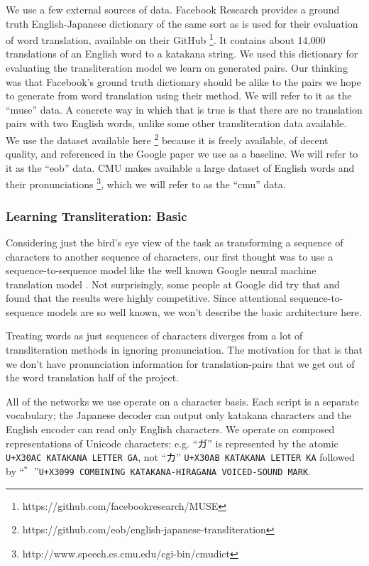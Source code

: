 \documentclass{article}
\begin{document}
We use a few external sources of data.
Facebook Research provides a ground truth English-Japanese dictionary
of the same sort as is used for their evaluation of word translation,
available on their GitHub
\footnote{https://github.com/facebookresearch/MUSE}.
It contains about 14,000 translations of an English word to a katakana string.
We used this dictionary for evaluating the transliteration model
we learn on generated pairs.
Our thinking was that Facebook's ground truth dictionary
should be alike to the pairs we hope to generate from word translation
using their method.
We will refer to it as the ``muse'' data.
A concrete way in which that is true is that
there are no translation pairs with two English words,
unlike some other transliteration data available.
We use the dataset available here
\footnote{https://github.com/eob/english-japanese-transliteration}
because it is freely available,
of decent quality,
and referenced in the Google paper\cite{Rosca2016SequencetosequenceNN}
we use as a baseline.
We will refer to it as the ``eob'' data.
CMU makes available a large dataset of English words and their pronunciations
\footnote{http://www.speech.cs.cmu.edu/cgi-bin/cmudict},
which we will refer to as the ``cmu'' data.

\subsubsection*{Learning Transliteration: Basic}

Considering just the bird's eye view of the task
as transforming a sequence of characters to another sequence of characters,
our first thought was to use a sequence-to-sequence model
like the well known Google neural machine translation model
\cite{Wu2016GooglesNM}.
Not surprisingly,
some people at Google did try that \cite{Rosca2016SequencetosequenceNN}
and found that the results were highly competitive.
Since attentional sequence-to-sequence models \cite{Bahdanau2015NeuralMT}
are so well known,
we won't describe the basic architecture here.

Treating words as just sequences of characters
diverges from a lot of transliteration methods
in ignoring pronunciation.
The motivation for that
is that we don't have pronunciation information for translation-pairs
that we get out of the word translation half of the project.

All of the networks we use operate on a character basis.
Each script is a separate vocabulary;
the Japanese decoder can output only katakana characters
and the English encoder can read only English characters.
We operate on composed representations of Unicode characters:
e.g. ``ガ'' is represented by the atomic \texttt{U+X30AC KATAKANA LETTER GA},
not ``カ'' \texttt{U+X30AB KATAKANA LETTER KA} followed by
``゛''\texttt{U+X3099 COMBINING KATAKANA-HIRAGANA VOICED-SOUND MARK}.
\end{document}

